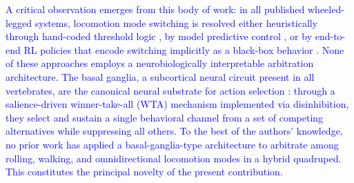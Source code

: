 \documentclass[preprint,12pt]{elsarticle}
\newcommand{\revblue}[1]{\textcolor{blue}{#1}}
\begin{document}
\revblue{A critical observation emerges from this body of work: in all published wheeled-legged systems, locomotion mode switching is resolved either heuristically through hand-coded threshold logic \citep{Bjelonic2019KeepRollin,Kashiri2019CENTAURO}, by model predictive control \citep{bjelonic2019,Bjelonic2022OfflineMotion}, or by end-to-end RL policies that encode switching implicitly as a black-box behavior \citep{Lee2024Science,Humphreys2025BioInspired}. None of these approaches employs a neurobiologically interpretable arbitration architecture. The basal ganglia, a subcortical neural circuit present in all vertebrates, are the canonical neural substrate for action selection \citep{Gurney2001a,Gurney2001b}: through a salience-driven winner-take-all (WTA) mechanism implemented via disinhibition, they select and sustain a single behavioral channel from a set of competing alternatives while suppressing all others. To the best of the authors' knowledge, no prior work has applied a basal-ganglia-type architecture to arbitrate among rolling, walking, and omnidirectional locomotion modes in a hybrid quadruped. This constitutes the principal novelty of the present contribution.}
\end{document}
